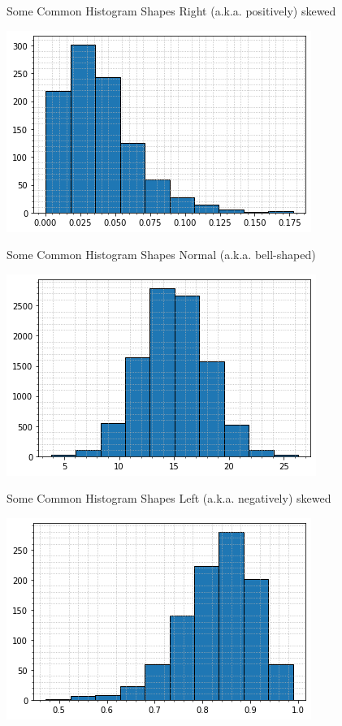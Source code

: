 \documentclass[t]{beamer}
\begin{document}
\begin{frame}{Some Common Histogram Shapes}
Right (a.k.a. positively) skewed
\begin{center}
\includegraphics[scale=0.55]{../Images/positive_skewed.png}
\end{center}
\end{frame}

\begin{frame}{Some Common Histogram Shapes}
Normal (a.k.a. bell-shaped)
\begin{center}
\includegraphics[scale=0.55]{../Images/normal1.png}
\end{center}
\end{frame}

\begin{frame}{Some Common Histogram Shapes}
Left (a.k.a. negatively) skewed
\begin{center}
\includegraphics[scale=0.55]{../Images/negative_skewed.png}
\end{center}
\end{frame}
\end{document}
